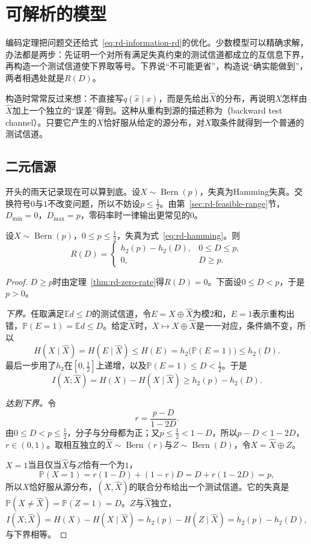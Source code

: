 \section{可解析的模型}
\label{sec:rd-analytic}

编码定理把问题交还给式~\eqref{eq:rd-information-rd}的优化。少数模型可以精确求解，办法都是两步：先证明一个对所有满足失真约束的测试信道都成立的互信息下界，再构造一个测试信道使下界取等号。下界说“不可能更省”，构造说“确实能做到”，两者相遇处就是$R(D)$。

构造时常常反过来想：不直接写$q(\hat{x}\mid x)$，而是先给出$\hat{X}$的分布，再说明$X$怎样由$\hat{X}$加上一个独立的“误差”得到。这种从重构到源的描述称为（backward test channel）。只要它产生的$X$恰好服从给定的源分布，对$X$取条件就得到一个普通的测试信道。

\subsection{二元信源}
\label{sec:rd-binary}

开头的雨天记录现在可以算到底。设$X\sim\operatorname{Bern}(p)$，失真为Hamming失真。交换符号$0$与$1$不改变问题，所以不妨设$p\leq\tfrac12$。由第~\ref{sec:rd-feasible-range}节，$D_{\min}=0$，$D_{\max}=p$，零码率时一律输出更常见的$0$。

\begin{theorem}[二元信源的率失真函数]
\label{thm:rd-binary}
设$X\sim\operatorname{Bern}(p)$，$0\leq p\leq\tfrac12$，失真为式~\eqref{eq:rd-hamming}。则
\begin{equation}
  R(D)=\begin{cases}
    h_2(p)-h_2(D), & 0\leq D\leq p,\\
    0, & D\geq p.
  \end{cases}
  \label{eq:rd-binary}
\end{equation}
\end{theorem}

\begin{proof}
$D\geq p$时由定理~\ref{thm:rd-zero-rate}得$R(D)=0$。下面设$0\leq D<p$，于是$p>0$。

\emph{下界。}任取满足$\mathbb{E}d\leq D$的测试信道，令$E=X\oplus\hat{X}$为模$2$和，$E=1$表示重构出错，$\mathbb{P}(E=1)=\mathbb{E}d\leq D$。给定$\hat{X}$时，$X\mapsto X\oplus\hat{X}$是一一对应，条件熵不变，所以
\[
  H(X\mid\hat{X})=H(E\mid\hat{X})\leq H(E)=h_2\bigl(\mathbb{P}(E=1)\bigr)\leq h_2(D).
\]
最后一步用了$h_2$在$[0,\tfrac12]$上递增，以及$\mathbb{P}(E=1)\leq D<\tfrac12$。于是
\[
  I(X;\hat{X})=H(X)-H(X\mid\hat{X})\geq h_2(p)-h_2(D).
\]

\emph{达到下界。}令
\[
  r=\frac{p-D}{1-2D}.
\]
由$0\leq D<p\leq\tfrac12$，分子与分母都为正；又$p\leq\tfrac12<1-D$，所以$p-D<1-2D$，$r\in(0,1)$。取相互独立的$\hat{X}\sim\operatorname{Bern}(r)$与$Z\sim\operatorname{Bern}(D)$，令$X=\hat{X}\oplus Z$。

$X=1$当且仅当$\hat{X}$与$Z$恰有一个为$1$，
\[
  \mathbb{P}(X=1)=r(1-D)+(1-r)D=D+r(1-2D)=p ,
\]
所以$X$恰好服从源分布，$(X,\hat{X})$的联合分布给出一个测试信道。它的失真是$\mathbb{P}(X\neq\hat{X})=\mathbb{P}(Z=1)=D$。$Z$与$\hat{X}$独立，
\[
  I(X;\hat{X})=H(X)-H(X\mid\hat{X})=h_2(p)-H(Z\mid\hat{X})=h_2(p)-h_2(D),
\]
与下界相等。
\end{proof}


